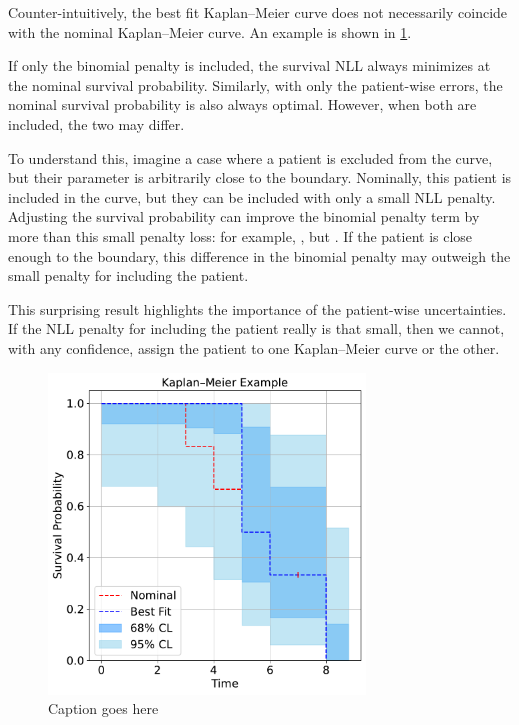 \documentclass[article]{jss}
\newcommand{\KM}{Kaplan--Meier} %
\begin{document}
Counter-intuitively, the best fit \KM{} curve does not necessarily coincide with the nominal \KM{} curve.  An example is shown in \cref{fig:best-fit-vs-nominal}.

If only the binomial penalty is included, the survival NLL always minimizes at the nominal survival probability.  Similarly, with only the patient-wise errors, the nominal survival probability is also always optimal.  However, when both are included, the two may differ.

To understand this, imagine a case where a patient is excluded from the curve, but their parameter is arbitrarily close to the boundary.  Nominally, this patient is included in the curve, but they can be included with only a small NLL penalty.  Adjusting the survival probability can improve the binomial penalty term by more than this small penalty loss:
for example, , but . %
If the patient is close enough to the boundary, this difference in the binomial penalty may outweigh the small penalty for including the patient.

This surprising result highlights the importance of the patient-wise uncertainties.  If the NLL penalty for including the patient really is that small, then we cannot, with any confidence, assign the patient to one \KM{} curve or the other.

\begin{figure}
  \centering
  \includegraphics[width=0.75\textwidth]{km_example.pdf}
  \caption{\label{fig:best-fit-vs-nominal} Caption goes here}
\end{figure}
\end{document}

